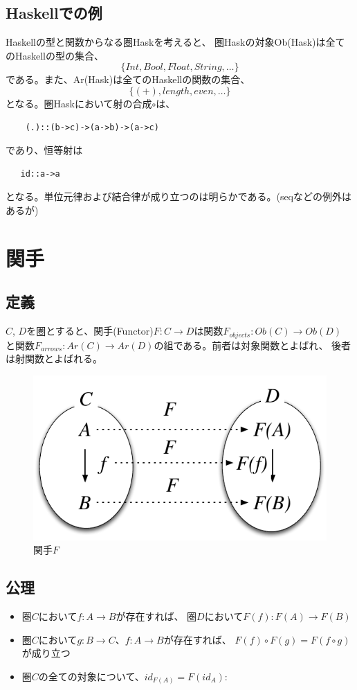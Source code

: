 \documentclass{jsarticle}
\begin{document}
\subsection{Haskellでの例}
Haskellの型と関数からなる圏Haskを考えると、
圏Haskの対象Ob(Hask)は全てのHaskellの型の集合、
\[\{Int, Bool, Float, String, \ldots\}\]
である。また、Ar(Hask)は全てのHaskellの関数の集合、
\[\{(+), length, even, \ldots\}\]
となる。圏Haskにおいて射の合成$\circ$は、
\begin{lstlisting}
    (.)::(b->c)->(a->b)->(a->c)
\end{lstlisting}
であり、恒等射は
\begin{lstlisting}
   id::a->a
\end{lstlisting}
となる。単位元律および結合律が成り立つのは明らかである。(seqなどの例外はあるが)

\newpage
\section{関手}

\subsection{定義}
$C$, $D$を圏とすると、関手(Functor)$F:C \to D$は関数$F_{objects}:Ob(C) \to Ob(D)$
と関数$F_{arrows}:Ar(C)\to Ar(D)$の組である。前者は対象関数とよばれ、
後者は射関数とよばれる。

\begin{figure}[htbp]
    \centering
    \includegraphics{diag_functor.pdf}
    \caption{関手$F$}
\end{figure}

\subsection{公理}
\begin{itemize}
    \item 圏$C$において$f:A\to B$が存在すれば、
        圏$D$において$F(f):F(A)\to F(B)$
    \item 圏$C$において$g:B\to C$、$f:A\to B$が存在すれば、
        $F(f)\circ F(g)=F(f\circ g)$が成り立つ
    \item 圏$C$の全ての対象について、$id_{F(A)}=F(id_A)$:
\end{itemize}
\end{document}
